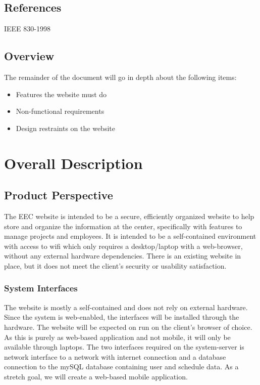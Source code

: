 \documentclass[letterpaper,10pt,titlepage,journal,compsoc,draftclsnofoot,onecolumn]{IEEEtran}
\begin{document}
\subsection{References}

IEEE 830-1998

\subsection{Overview}

The remainder of the document will go in depth about the following items:
\begin{itemize}
\item Features the website must do
\item Non-functional requirements
\item Design restraints on the website
\end{itemize}

\section{Overall Description}

\subsection{Product Perspective}

The EEC website is intended to be a secure, efficiently organized website to help store and organize the information at the center, specifically with features to manage projects and employees. It is intended to be a self-contained environment with access to wifi which only requires a desktop/laptop with a web-browser, without any external hardware dependencies. There is an existing website in place, but it does not meet the client’s security or usability satisfaction.

\subsubsection{System Interfaces}

The website is mostly a self-contained and does not rely on external hardware. Since the system is web-enabled, the interfaces will be installed through the hardware. The website will be expected on run on the client’s browser of choice. As this is purely as web-based application and not mobile, it will only be available through laptops. The two interfaces required on the system-server is network interface to a network with internet connection and a database connection to the mySQL database containing user and schedule data. As a stretch goal, we will create a web-based mobile application. 
\end{document}
